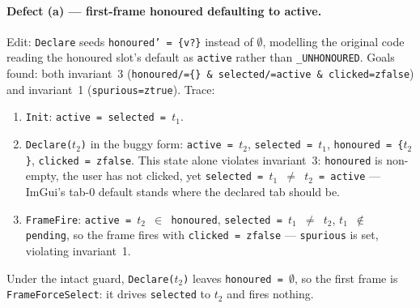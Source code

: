 \documentclass[a4paper,10pt,fleqn]{article}
\begin{document}
\paragraph{Defect (a) --- first-frame honoured defaulting to active.}
Edit: \texttt{Declare} seeds \texttt{honoured' = \{v?\}} instead of
\texttt{$\emptyset$}, modelling the original code reading the honoured slot's
default as \texttt{active} rather than \texttt{\_UNHONOURED}.  Goals found:
both invariant~3 (\texttt{honoured/=\{\} \& selected/=active \&
clicked=zfalse}) and invariant~1 (\texttt{spurious=ztrue}).  Trace:
\begin{enumerate}
  \item \texttt{Init}: \texttt{active = selected = $t_1$}.
  \item \texttt{Declare($t_2$)} in the buggy form: \texttt{active = $t_2$},
    \texttt{selected = $t_1$}, \texttt{honoured = \{$t_2$\}},
    \texttt{clicked = zfalse}.  This state alone violates invariant~3:
    \texttt{honoured} is non-empty, the user has not clicked, yet
    \texttt{selected = $t_1$ $\neq$ $t_2$ = active} --- ImGui's tab-0 default
    stands where the declared tab should be.
  \item \texttt{FrameFire}: \texttt{active = $t_2$ $\in$ honoured},
    \texttt{selected = $t_1$ $\neq$ $t_2$}, \texttt{$t_1$ $\notin$ pending}, so
    the frame fires with \texttt{clicked = zfalse} --- \texttt{spurious} is set,
    violating invariant~1.
\end{enumerate}
Under the intact guard, \texttt{Declare($t_2$)} leaves \texttt{honoured =
$\emptyset$}, so the first frame is \texttt{FrameForceSelect}: it drives
\texttt{selected} to $t_2$ and fires nothing.
\end{document}
